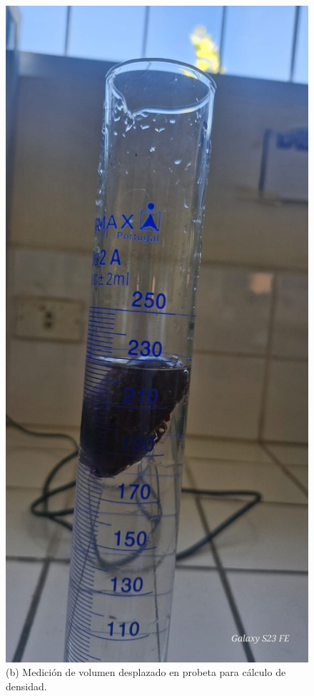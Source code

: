\documentclass[manuscript,screen,review]{acmart}
\begin{document}
\begin{figure}[H]
\begin{minipage}{0.2\linewidth}
    \includegraphics[width=\linewidth]{imagen/densidad.jpeg}
    \vspace{1mm}
    \small (b) Medición de volumen desplazado en probeta para cálculo de densidad.
  \end{minipage}


\end{figure}
\end{document}

